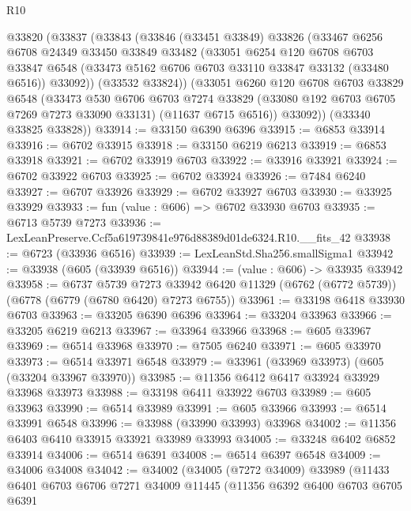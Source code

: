 \begin{lexlean}{R10}
\begin{coremodule}
  @33820
    (@33837
      (@33843
        (@33846
          (@33451 @33849)
          @33826
          (@33467
            @6256
            @6708
            @24349
            @33450
            @33849
            @33482
            (@33051
              @6254
              @120
              @6708
              @6703
              @33847
              @6548
              (@33473 @5162 @6706 @6703 @33110 @33847 @33132 (@33480 @6516))
              @33092))
          (@33532 @33824))
        (@33051
          @6260
          @120
          @6708
          @6703
          @33829
          @6548
          (@33473
            @530
            @6706
            @6703
            @7274
            @33829
            (@33080 @192 @6703 @6705 @7269 @7273 @33090 @33131)
            (@11637 @6715 @6516))
          @33092))
      (@33340 @33825 @33828))
@33914 := @33150 @6390 @6396
@33915 := @6853 @33914
@33916 := @6702 @33915
@33918 := @33150 @6219 @6213
@33919 := @6853 @33918
@33921 := @6702 @33919 @6703
@33922 := @33916 @33921
@33924 := @6702 @33922 @6703
@33925 := @6702 @33924
@33926 := @7484 @6240
@33927 := @6707 @33926
@33929 := @6702 @33927 @6703
@33930 := @33925 @33929
@33933 := fun (value : @606) => @6702 @33930 @6703
@33935 := @6713 @5739 @7273
@33936 := LexLeanPreserve.Ccf5a619739841e976d88389d01de6324.R10.__fits_42
@33938 := @6723 (@33936 @6516)
@33939 := LexLeanStd.Sha256.smallSigma1
@33942 := @33938 (@605 (@33939 @6516))
@33944 := (value : @606) -> @33935 @33942
@33958 := @6737
    @5739
    @7273
    @33942
    @6420
    @11329
    (@6762 (@6772 @5739))
    (@6778 (@6779 (@6780 @6420) @7273 @6755))
@33961 := @33198 @6418 @33930 @6703
@33963 := @33205 @6390 @6396
@33964 := @33204 @33963
@33966 := @33205 @6219 @6213
@33967 := @33964 @33966
@33968 := @605 @33967
@33969 := @6514 @33968
@33970 := @7505 @6240
@33971 := @605 @33970
@33973 := @6514 @33971 @6548
@33979 := @33961 (@33969 @33973) (@605 (@33204 @33967 @33970))
@33985 := @11356 @6412 @6417 @33924 @33929 @33968 @33973
@33988 := @33198 @6411 @33922 @6703
@33989 := @605 @33963
@33990 := @6514 @33989
@33991 := @605 @33966
@33993 := @6514 @33991 @6548
@33996 := @33988 (@33990 @33993) @33968
@34002 := @11356 @6403 @6410 @33915 @33921 @33989 @33993
@34005 := @33248 @6402 @6852 @33914
@34006 := @6514 @6391
@34008 := @6514 @6397 @6548
@34009 := @34006 @34008
@34042 := @34002
    (@34005
      (@7272 @34009)
      @33989
      (@11433
        @6401
        @6703
        @6706
        @7271
        @34009
        @11445
        (@11356
          @6392
          @6400
          @6703
          @6705
          @6391

\end{coremodule}
\end{lexlean}
